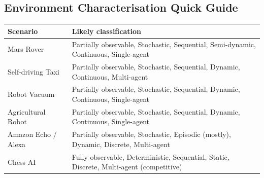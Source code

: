 \documentclass[12pt, a4paper]{article}
\begin{document}
\subsection*{Environment Characterisation Quick Guide}

\begin{center}
\renewcommand{\arraystretch}{1.4}
\begin{tabular}{l|l}
\toprule
\textbf{Scenario} & \textbf{Likely classification} \\
\midrule
Mars Rover & Partially observable, Stochastic, Sequential, Semi-dynamic, Continuous, Single-agent \\
Self-driving Taxi & Partially observable, Stochastic, Sequential, Dynamic, Continuous, Multi-agent \\
Robot Vacuum & Partially observable, Stochastic, Sequential, Dynamic, Continuous, Single-agent \\
Agricultural Robot & Partially observable, Stochastic, Sequential, Dynamic, Continuous, Single-agent \\
Amazon Echo / Alexa & Partially observable, Stochastic, Episodic (mostly), Dynamic, Discrete, Multi-agent \\
Chess AI & Fully observable, Deterministic, Sequential, Static, Discrete, Multi-agent (competitive) \\
\bottomrule
\end{tabular}
\end{center}
\end{document}
